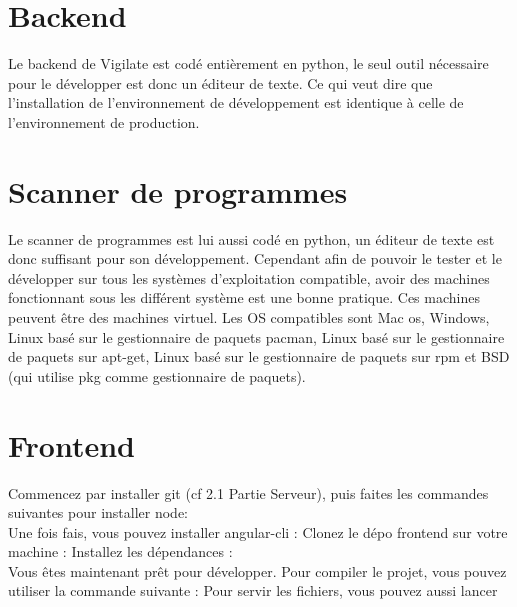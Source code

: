 \section{Backend}
Le backend de Vigilate est codé entièrement en python, le seul outil nécessaire pour le développer est donc un éditeur de texte. Ce qui veut dire que l’installation de l’environnement de développement est identique à celle de l’environnement de production.
\section{Scanner de programmes}
Le scanner de programmes est lui aussi codé en python, un éditeur de texte est donc suffisant pour son développement. Cependant afin de pouvoir le tester et le développer sur tous les systèmes d’exploitation compatible, avoir des machines fonctionnant sous les différent système est une bonne pratique. Ces machines peuvent être des machines virtuel. Les OS compatibles sont Mac os, Windows, Linux basé sur le gestionnaire de paquets pacman, Linux basé sur le gestionnaire de paquets sur apt-get, Linux basé sur le gestionnaire de paquets sur rpm et BSD (qui utilise pkg comme gestionnaire de paquets).
\section{Frontend}
Commencez par installer git (cf 2.1 Partie Serveur), puis faites les commandes suivantes pour installer node:
\\
Une fois fais, vous pouvez installer angular-cli :
Clonez le dépo frontend sur votre machine :
Installez les dépendances :
\\
Vous êtes maintenant prêt pour développer.
Pour compiler le projet, vous pouvez utiliser la commande suivante :
Pour servir les fichiers, vous pouvez aussi lancer
